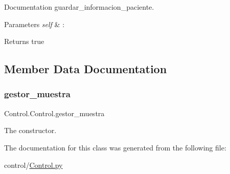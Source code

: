 Documentation guardar\+\_\+informacion\+\_\+paciente. 


\begin{DoxyParams}{Parameters}
{\em self} & \+: \\
\hline
\end{DoxyParams}
\begin{DoxyReturn}{Returns}
true 
\end{DoxyReturn}


\subsection{Member Data Documentation}
\mbox{\label{class_control_1_1_control_a3f36ff12e9a8426c59576f5273feb27f}} 
\subsubsection{\texorpdfstring{gestor\+\_\+muestra}{gestor\_muestra}}
{\footnotesize\ttfamily Control.\+Control.\+gestor\+\_\+muestra}



The constructor. 



The documentation for this class was generated from the following file\+:\begin{DoxyCompactItemize}
\item 
control/\mbox{\hyperlink{_control_8py}{Control.\+py}}\end{DoxyCompactItemize}
